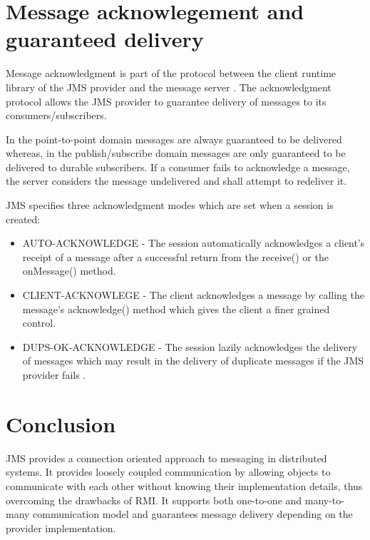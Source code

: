 \documentclass[9pt,twocolumn,twoside]{../../styles/osajnl}
\begin{document}
\section{Message acknowlegement and guaranteed delivery}


Message acknowledgment is part of the protocol between the client
runtime library of the JMS provider and the message server
\cite{www-jms-fischli-article}. The acknowledgment protocol allows the
JMS provider to guarantee delivery of messages to its
consumers/subscribers.

In the point-to-point domain messages are always guaranteed to be
delivered whereas, in the publish/subscribe domain messages are only
guaranteed to be delivered to durable subscribers.  If a consumer
fails to acknowledge a message, the server considers the message
undelivered and shall attempt to redeliver it.

JMS specifies three acknowledgment modes which are set when a session
is created:
\begin{itemize}
\item AUTO-ACKNOWLEDGE - The session automatically acknowledges
a client's receipt of a message after a successful return from the
receive() or the onMessage() method.
\item CLIENT-ACKNOWLEGE - The client
acknowledges a message by calling the message's acknowledge() method
which gives the client a finer grained control.
\item DUPS-OK-ACKNOWLEDGE - The session lazily acknowledges the
delivery of messages which may result in the delivery of duplicate
messages if the JMS provider fails \cite{www-jms-fischli-article}.

\end{itemize}


\section{Conclusion}
JMS provides a connection oriented approach to messaging in
distributed systems. It provides loosely coupled communication by
allowing objects to communicate with each other without knowing their
implementation details, thus overcoming the drawbacks of RMI. It
supports both one-to-one and many-to-many communication model and
guarantees message delivery depending on the provider implementation.




\end{document}
